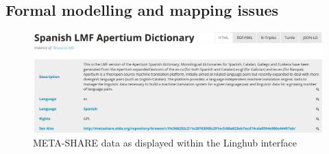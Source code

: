 \documentclass{llncs}
\begin{document}
\subsection{Formal modelling and mapping issues}
\label{sec:mapping}

\begin{figure}
    \centering
    \includegraphics[width=.9\textwidth]{linghub-screenshot.png}
    \caption{META-SHARE data as displayed within the Linghub
    interface\label{fig:screenshot}}
\end{figure}
\end{document}
